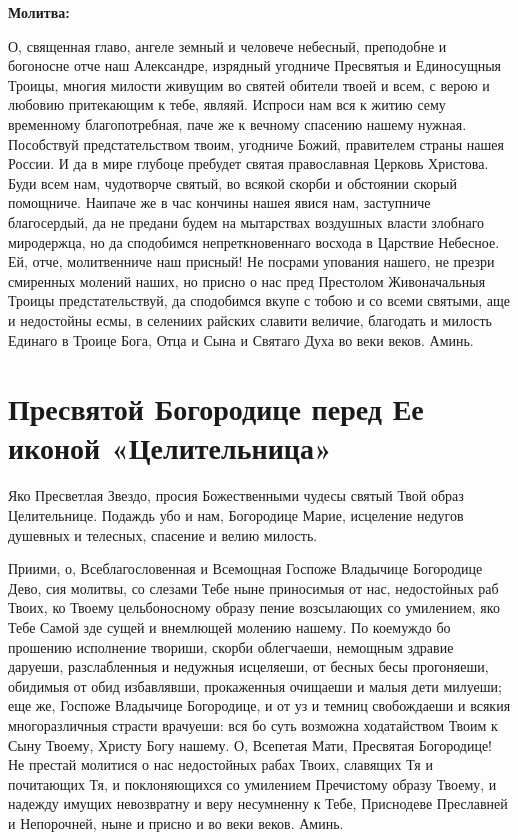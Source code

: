 \bfseries Молитва:\normalfont{}


О, священная главо, ангеле земный и человече небесный, преподобне и богоносне отче наш Александре, изрядный угодниче Пресвятыя и Единосущныя Троицы, многия милости живущим во святей обители твоей и всем, с верою и любовию притекающим к тебе, являяй. Испроси нам вся к житию сему временному благопотребная, паче же к вечному спасению нашему нужная. Пособствуй предстательством твоим, угодниче Божий, правителем страны нашея России. И да в мире глубоце пребудет святая православная Церковь Христова. Буди всем нам, чудотворче святый, во всякой скорби и обстоянии скорый помощниче. Наипаче же в час кончины нашея явися нам, заступниче благосердый, да не предани будем на мытарствах воздушных власти злобнаго миродержца, но да сподобимся непреткновеннаго восхода в Царствие Небесное. Ей, отче, молитвенниче наш присный! Не посрами упования нашего, не презри смиренных молений наших, но присно о нас пред Престолом Живоначальныя Троицы предстательствуй, да сподобимся вкупе с тобою и со всеми святыми, аще и недостойны есмы, в селениих райских славити величие, благодать и милость Единаго в Троице Бога, Отца и Сына и Святаго Духа во веки веков. Аминь.\mychapterending


 

\section{Пресвятой Богородице перед Ее иконой «Целительница»}
 



Яко Пресветлая Звездо, просия Божественными чудесы святый Твой образ Целительнице. Подаждь убо и нам, Богородице Марие, исцеление недугов душевных и телесных, спасение и велию милость.




Приими, о, Всеблагословенная и Всемощная Госпоже Владычице Богородице Дево, сия молитвы, со слезами Тебе ныне приносимыя от нас, недостойных раб Твоих, ко Твоему цельбоносному образу пение возсылающих со умилением, яко Тебе Самой зде сущей и внемлющей молению нашему. По коемуждо бо прошению исполнение твориши, скорби облегчаеши, немощным здравие даруеши, разслабленныя и недужныя исцеляеши, от бесных бесы прогоняеши, обидимыя от обид избавлявши, прокаженныя очищаеши и малыя дети милуеши; еще же, Госпоже Владычице Богородице, и от уз и темниц свобождаеши и всякия многоразличныя страсти врачуеши: вся бо суть возможна ходатайством Твоим к Сыну Твоему, Христу Богу нашему. О, Всепетая Мати, Пресвятая Богородице! Не престай молитися о нас недостойных рабах Твоих, славящих Тя и почитающих Тя, и поклоняющихся со умилением Пречистому образу Твоему, и надежду имущих невозвратну и веру несумненну к Тебе, Приснодеве Преславней и Непорочней, ныне и присно и во веки веков. Аминь.


